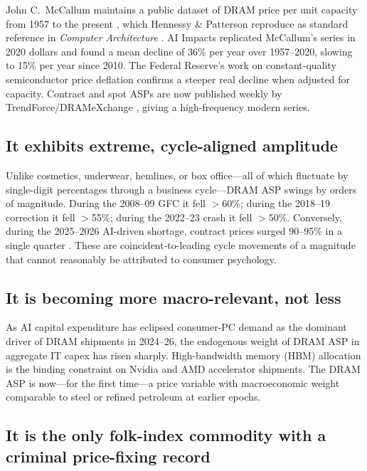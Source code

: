 \documentclass[12pt]{article}
\theoremstyle{definition}
\begin{document}
John C.\ McCallum maintains a public dataset of DRAM price per unit capacity from 1957 to the present \cite{McCallum2024}, which Hennessy \& Patterson reproduce as standard reference in \emph{Computer Architecture} \cite{HennessyPatterson2019}. AI Impacts \cite{AIImpacts2020} replicated McCallum's series in 2020 dollars and found a mean decline of 36\% per year over 1957--2020, slowing to 15\% per year since 2010. The Federal Reserve's work on constant-quality semiconductor price deflation \cite{Aizcorbe2006} confirms a steeper real decline when adjusted for capacity. Contract and spot ASPs are now published weekly by TrendForce/DRAMeXchange \cite{TrendForce2026}, giving a high-frequency modern series.

\subsection{It exhibits extreme, cycle-aligned amplitude}

Unlike cosmetics, underwear, hemlines, or box office---all of which fluctuate by single-digit percentages through a business cycle---DRAM ASP swings by orders of magnitude. During the 2008--09 GFC it fell $>$60\%; during the 2018--19 correction it fell $>$55\%; during the 2022--23 crash it fell $>$50\%. Conversely, during the 2025--2026 AI-driven shortage, contract prices surged 90--95\% in a single quarter \cite{TrendForce2026Q1}. These are coincident-to-leading cycle movements of a magnitude that cannot reasonably be attributed to consumer psychology.

\subsection{It is becoming more macro-relevant, not less}

As AI capital expenditure has eclipsed consumer-PC demand as the dominant driver of DRAM shipments in 2024--26, the endogenous weight of DRAM ASP in aggregate IT capex has risen sharply. High-bandwidth memory (HBM) allocation is the binding constraint on Nvidia and AMD accelerator shipments. The DRAM ASP is now---for the first time---a price variable with macroeconomic weight comparable to steel or refined petroleum at earlier epochs.

\subsection{It is the only folk-index commodity with a criminal price-fixing record}
\end{document}
